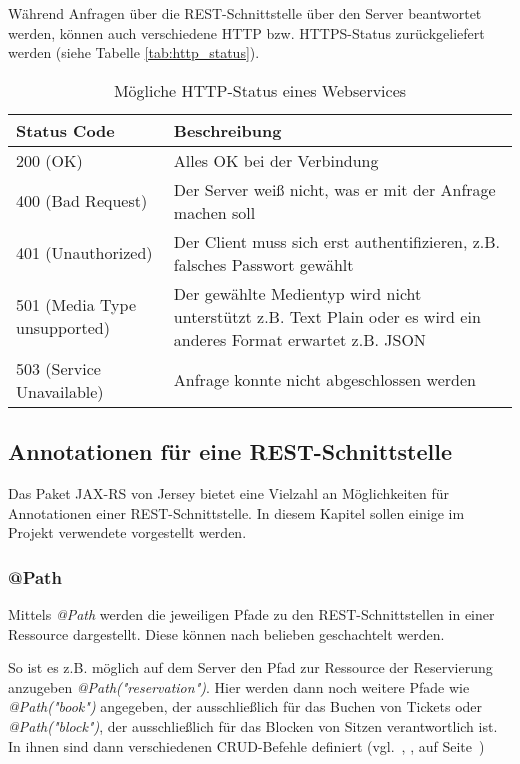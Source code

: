 Während Anfragen über die \acs{REST}-Schnittstelle über den Server beantwortet werden, können auch verschiedene \acs{HTTP} bzw. \acs{HTTPS}-Status zurückgeliefert werden (siehe Tabelle \vref{tab:http_status}).

\begin{table}[!hpt]
	\renewcommand{\arraystretch}{1.2}
	\centering
	\begin{tabular}{l|p{8.5cm}}
		Status Code & Beschreibung \\
		\hline
		200 (OK) & Alles OK bei der Verbindung \\
		400 (Bad Request) & Der Server weiß nicht, was er mit der Anfrage machen soll \\
		401 (Unauthorized) & Der Client muss sich erst authentifizieren, z.B. falsches Passwort gewählt \\
		501 (Media Type unsupported) & Der gewählte Medientyp wird nicht unterstützt z.B. Text Plain oder es wird ein anderes Format erwartet z.B. \acs{JSON} \\
		503 (Service Unavailable) & Anfrage konnte nicht abgeschlossen werden
	\end{tabular}
	\caption{Mögliche \acs{HTTP}-Status eines Webservices}
\label{tab:http_status}
\end{table}
\clearpage

\subsection{Annotationen für eine \acs{REST}-Schnittstelle}
\label{ssec:annotationen_schnittstelle}

Das Paket JAX-RS von Jersey bietet eine Vielzahl an Möglichkeiten für Annotationen einer \acs{REST}-Schnittstelle.
In diesem Kapitel sollen einige im Projekt verwendete vorgestellt werden.

\subsubsection*{@Path}
Mittels \textit{@Path} werden die jeweiligen Pfade zu den \acs{REST}-Schnittstellen in einer Ressource dargestellt.
Diese können nach belieben geschachtelt werden.

So ist es z.B. möglich auf dem Server den Pfad zur Ressource der Reservierung anzugeben \textit{@Path("reservation")}.
Hier werden dann noch weitere Pfade wie \textit{@Path("book")} angegeben, der ausschließlich für das Buchen von Tickets oder \textit{@Path("block")}, der ausschließlich für das Blocken von Sitzen verantwortlich ist.
In ihnen sind dann verschiedenen \acs{CRUD}-Befehle definiert (vgl.~, ,  auf Seite~\pageref{sss:delete}) 

